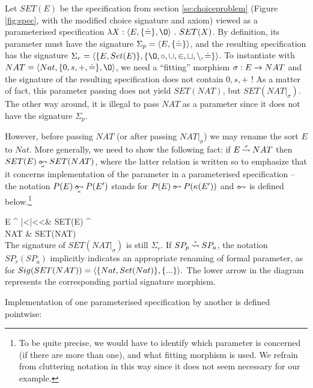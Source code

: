 Let $SET(E)$ be the specification from section \ref{se:choiceproblem} (Figure \ref{fig:spec}, with the modified choice signature and axiom) viewed as a parameterised specification
$\lambda X:\<E,\{\Eq\},\es\>\ .\ SET(X)$. By definition, its parameter must have the signature $\Sigma_p=\langle E,\{\mathbin{\doteq}\}\rangle$, and the resulting specification has the signature $\Sigma_r=\<\{E,Set(E)\},\{\es,\ap,\cup,\in,\ch,\setminus,\Eq\}\>$. To instantiate with $NAT=\<Nat,\{0,s,+,\Eq\},\es\>$, we need a ``fitting'' 
morphism $\sigma:E\rightarrow NAT$ and the signature of the resulting specification does not contain $0,s,+$ ! As a matter of fact, this parameter passing does not yield $SET(NAT)$, but $SET(NAT|_\sigma)$. The other way around, it is illegal to pass $NAT$ as a parameter since it does not have the signature $\Sigma_p$. 

However, before passing $NAT$ (or after passing $NAT|_\sigma$) we may rename the sort $E$ to $Nat$. More generally, we need to show the following fact:
if $E\mathbin{\stackrel{\scriptscriptstyle \sigma}{\mathbin{\leadsto}}} NAT$ then $SET(E)\pimp{}{\sigma} SET(NAT)$, where the latter relation is written so to emphasize that it concerns implementation of the parameter in a parameterised specification -- the notation
$P(E)\pimp{}{\kappa}P(E')$ stands for $P(E)\pim P(\kappa(E'))$ and $\pim$ is defined below.\footnote
{To be quite precise, we would have to identify which parameter is concerned (if there are more than one), and what fitting morphism is used. We refrain from cluttering
notation in this way since it does not seem necessary for our example.} 

\vspace{1ex}\hspace{12em}\diagram
E \dto^{\imm\sigma} \rto|<\hole|<<\ahook & SET(E) \dto^{\pimp{}\sigma} \\ %
NAT \rto & SET(NAT)
\enddiagram \\[1ex]
The signature of $SET(NAT|_\sigma)$ is still $\Sigma_r$. If $SP_p\mathbin{\stackrel{\scriptscriptstyle *}{\mathbin{\leadsto}}}SP_a$,
the
notation $SP_r(SP_a)$
implicitly indicates an appropriate renaming of formal parameter, as for $Sig(SET(NAT))=\langle\{Nat,
Set(Nat)\},\{...\}\rangle.$ The lower arrow in the diagram represents the corresponding partial signature morphism. 

Implementation of one parameterised specification by another is defined pointwise:

